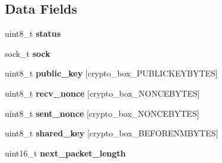 \subsection*{Data Fields}
\begin{DoxyCompactItemize}
\item 
\hypertarget{struct_t_c_p___secure___connection_ade818037fd6c985038ff29656089758d}{uint8\+\_\+t {\bfseries status}}\label{struct_t_c_p___secure___connection_ade818037fd6c985038ff29656089758d}

\item 
\hypertarget{struct_t_c_p___secure___connection_a35b19d84fb632ca8ce5cab237f7089a5}{sock\+\_\+t {\bfseries sock}}\label{struct_t_c_p___secure___connection_a35b19d84fb632ca8ce5cab237f7089a5}

\item 
\hypertarget{struct_t_c_p___secure___connection_aaa806bb1136fb3d4b5d8d8970b596ff7}{uint8\+\_\+t {\bfseries public\+\_\+key} \mbox{[}crypto\+\_\+box\+\_\+\+P\+U\+B\+L\+I\+C\+K\+E\+Y\+B\+Y\+T\+E\+S\mbox{]}}\label{struct_t_c_p___secure___connection_aaa806bb1136fb3d4b5d8d8970b596ff7}

\item 
\hypertarget{struct_t_c_p___secure___connection_aae0467706f97aa3ef23e5dc9c3c199d7}{uint8\+\_\+t {\bfseries recv\+\_\+nonce} \mbox{[}crypto\+\_\+box\+\_\+\+N\+O\+N\+C\+E\+B\+Y\+T\+E\+S\mbox{]}}\label{struct_t_c_p___secure___connection_aae0467706f97aa3ef23e5dc9c3c199d7}

\item 
\hypertarget{struct_t_c_p___secure___connection_a9df0e00e8f493ed6cd1ff45e7da33c0d}{uint8\+\_\+t {\bfseries sent\+\_\+nonce} \mbox{[}crypto\+\_\+box\+\_\+\+N\+O\+N\+C\+E\+B\+Y\+T\+E\+S\mbox{]}}\label{struct_t_c_p___secure___connection_a9df0e00e8f493ed6cd1ff45e7da33c0d}

\item 
\hypertarget{struct_t_c_p___secure___connection_a81ead9fac55a0cedc30a96253a2c5119}{uint8\+\_\+t {\bfseries shared\+\_\+key} \mbox{[}crypto\+\_\+box\+\_\+\+B\+E\+F\+O\+R\+E\+N\+M\+B\+Y\+T\+E\+S\mbox{]}}\label{struct_t_c_p___secure___connection_a81ead9fac55a0cedc30a96253a2c5119}

\item 
\hypertarget{struct_t_c_p___secure___connection_a1d1e3047af3c935db36ae7b2360aaec7}{uint16\+\_\+t {\bfseries next\+\_\+packet\+\_\+length}}\label{struct_t_c_p___secure___connection_a1d1e3047af3c935db36ae7b2360aaec7}


\end{DoxyCompactItemize}

